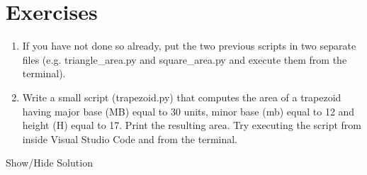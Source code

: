\documentclass[letterpaper,10pt,english]{sphinxmanual}
\begin{document}
\section{Exercises}
\label{\detokenize{M1_practical1:Exercises}}\begin{enumerate}
%
\item {} 
\sphinxAtStartPar
If you have not done so already, put the two previous scripts in two separate files (e.g. triangle\_area.py and square\_area.py and execute them from the terminal).

\item {} 
\sphinxAtStartPar
Write a small script (trapezoid.py) that computes the area of a trapezoid having major base (MB) equal to 30 units, minor base (mb) equal to 12 and height (H) equal to 17. Print the resulting area. Try executing the script from inside Visual Studio Code and from the terminal.

\end{enumerate}



\sphinxAtStartPar
Show/Hide Solution
\end{document}
